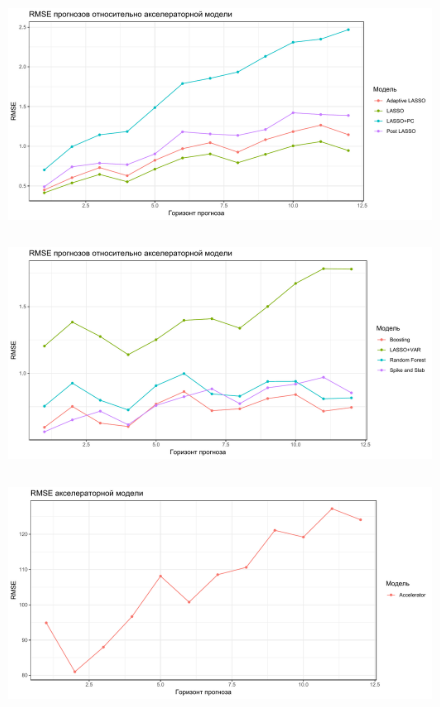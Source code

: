 \documentclass[c, dvipsnames]{beamer}  %
\begin{document}
 \begin{frame}
\frametitle{\insertsection} 
\framesubtitle{\insertsubsection}
\begin{figure}
\includegraphics[width=\linewidth]{rmse2.pdf}
\end{figure}
\end{frame} 


 \begin{frame}
\frametitle{\insertsection} 
\framesubtitle{\insertsubsection}
\begin{figure}
\includegraphics[width=\linewidth]{rmse3.pdf}
\end{figure}
\end{frame} 


 \begin{frame}
\frametitle{\insertsection} 
\framesubtitle{\insertsubsection}
\begin{figure}
\includegraphics[width=\linewidth]{rmse4.pdf}
\end{figure}
\end{frame} 
\end{document}
